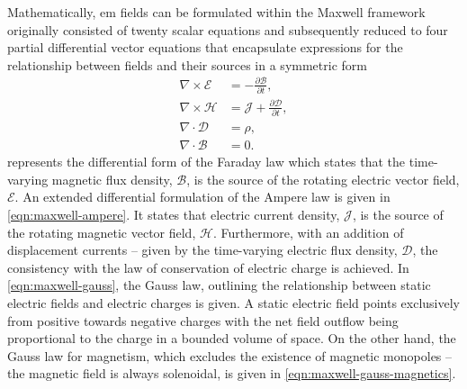 Mathematically, \gls{em} fields can be formulated within the Maxwell framework originally consisted of twenty scalar equations and subsequently reduced to four partial differential vector equations that encapsulate expressions for the relationship between fields and their sources in a symmetric form~\cite{Poljak2006Advanced}
\begin{align}
    \label{eqn:maxwell-faraday}
    \nabla \times \mathcal{E} &= -\frac{\partial \mathcal{B}}{\partial t},\\
    \label{eqn:maxwell-ampere}
    \nabla \times\mathcal{H} &= \mathcal{J} + \frac{\partial \mathcal{D}}{\partial t},\\
    \label{eqn:maxwell-gauss}
    \nabla \cdot \mathcal{D} & = \rho,\\
    \label{eqn:maxwell-gauss-magnetics}
    \nabla \cdot \mathcal{B} &= 0.
\end{align}
 represents the differential form of the Faraday law which states that the time-varying magnetic flux density, $\mathcal{B}$, is the source of the rotating electric vector field, $\mathcal{E}$.
An extended differential formulation of the Ampere law is given in \cref{eqn:maxwell-ampere}.
It states that electric current density, $\mathcal{J}$, is the source of the rotating magnetic vector field, $\mathcal{H}$.
Furthermore, with an addition of displacement currents -- given by the time-varying electric flux density, $\mathcal{D}$, the consistency with the law of conservation of electric charge is achieved.
In \cref{eqn:maxwell-gauss}, the Gauss law, outlining the relationship between static electric fields and electric charges is given.
A static electric field points exclusively from positive towards negative charges with the net field outflow being proportional to the charge in a bounded volume of space.
On the other hand, the Gauss law for magnetism, which excludes the existence of magnetic monopoles -- the magnetic field is always solenoidal, is given in \cref{eqn:maxwell-gauss-magnetics}.

